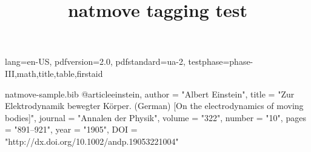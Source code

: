 \DocumentMetadata
  {
    lang=en-US,
    pdfversion=2.0,
    pdfstandard=ua-2,
    testphase={phase-III,math,title,table,firstaid}
  }
\begin{filecontents}{natmove-sample.bib}
@article{einstein,
    author =       "Albert Einstein",
    title =        "{Zur Elektrodynamik bewegter K{\"o}rper}. ({German})
        [{On} the electrodynamics of moving bodies]",
    journal =      "Annalen der Physik",
    volume =       "322",
    number =       "10",
    pages =        "891--921",
    year =         "1905",
    DOI =          "http://dx.doi.org/10.1002/andp.19053221004"
}
\end{filecontents}

\documentclass{article}

\usepackage[numbers,super]{natbib}
\usepackage{natmove}
\usepackage{hyperref}

\title{natmove tagging test}



Some text \cite{einstein} some more text.

Some text ending a sentence \cite{einstein}.




